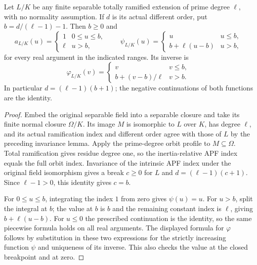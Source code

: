\begin{theorem}
\label{fw:intrinsic-prime-degree-apf-profile}
\leanok
Let $L/K$ be any finite separable totally ramified extension of
prime degree $\ell$, with no normality assumption. If $d$ is its
actual different order, put $b=d/(\ell-1)-1$. Then $b\geq0$ and
\[
 a_{L/K}(u)=\begin{cases}1&0\leq u\leq b,\\ \ell&u>b,\end{cases}
 \qquad
 \psi_{L/K}(u)=\begin{cases}u&u\leq b,\\b+\ell(u-b)&u>b,\end{cases}
\]
for every real argument in the indicated ranges. Its inverse is
\[
 \varphi_{L/K}(v)=\begin{cases}v&v\leq b,\\
 b+(v-b)/\ell&v>b.\end{cases}
\]
In particular $d=(\ell-1)(b+1)$; the negative continuations of
both functions are the identity.
\end{theorem}
\begin{proof}
Embed the original separable field into a separable closure and
take its finite normal closure $\Omega/K$. Its image $M$ is
isomorphic to $L$ over $K$, has degree $\ell$, and its actual
ramification index and different order agree with those of $L$
by the preceding invariance lemma. Apply the prime-degree orbit
profile to $M\subseteq\Omega$. Total ramification gives residue
degree one, so the inertia-relative APF index equals the full
orbit index. Invariance of the intrinsic APF index under the
original field isomorphism gives a break $c\geq0$ for $L$ and
$d=(\ell-1)(c+1)$. Since $\ell-1>0$, this identity gives $c=b$.

For $0\leq u\leq b$, integrating the index $1$ from zero gives
$\psi(u)=u$. For $u>b$, split the integral at $b$; the value at
$b$ is $b$ and the remaining constant index is $\ell$, giving
$b+\ell(u-b)$. For $u\leq0$ the prescribed continuation is the
identity, so the same piecewise formula holds on all real
arguments. The displayed formula for $\varphi$ follows by
substitution in these two expressions for the strictly increasing
function $\psi$ and uniqueness of its inverse. This also checks
the value at the closed breakpoint and at zero.
\end{proof}
